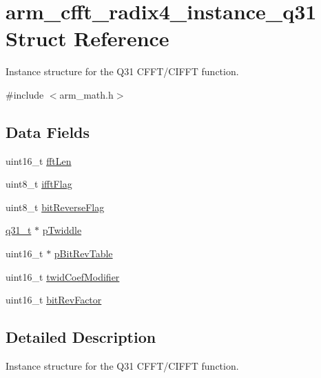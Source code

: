 \hypertarget{structarm__cfft__radix4__instance__q31}{}\section{arm\+\_\+cfft\+\_\+radix4\+\_\+instance\+\_\+q31 Struct Reference}
\label{structarm__cfft__radix4__instance__q31}


Instance structure for the Q31 C\+F\+F\+T/\+C\+I\+F\+FT function.  




{\ttfamily \#include $<$arm\+\_\+math.\+h$>$}

\subsection*{Data Fields}
\begin{DoxyCompactItemize}
\item 
uint16\+\_\+t \mbox{\hyperlink{structarm__cfft__radix4__instance__q31_ab8db3bbe7c61e6bb8ca2a55e3446e11a}{fft\+Len}}
\item 
uint8\+\_\+t \mbox{\hyperlink{structarm__cfft__radix4__instance__q31_ad6ca6e223f986ebfd94c5ee1e410aa73}{ifft\+Flag}}
\item 
uint8\+\_\+t \mbox{\hyperlink{structarm__cfft__radix4__instance__q31_a09a221a818c6d0e064557a99e2fe9a8b}{bit\+Reverse\+Flag}}
\item 
\mbox{\hyperlink{arm__math_8h_adc89a3547f5324b7b3b95adec3806bc0}{q31\+\_\+t}} $\ast$ \mbox{\hyperlink{structarm__cfft__radix4__instance__q31_a2505b7d5ec077b244c712797a5253b6d}{p\+Twiddle}}
\item 
uint16\+\_\+t $\ast$ \mbox{\hyperlink{structarm__cfft__radix4__instance__q31_a46a2fb328199897af100fea0bfdf59aa}{p\+Bit\+Rev\+Table}}
\item 
uint16\+\_\+t \mbox{\hyperlink{structarm__cfft__radix4__instance__q31_afe772e5b5001c9d8e85032115a8df5bf}{twid\+Coef\+Modifier}}
\item 
uint16\+\_\+t \mbox{\hyperlink{structarm__cfft__radix4__instance__q31_a33386d95319dc3ee7097b3a8e52e01ec}{bit\+Rev\+Factor}}
\end{DoxyCompactItemize}


\subsection{Detailed Description}
Instance structure for the Q31 C\+F\+F\+T/\+C\+I\+F\+FT function. 

